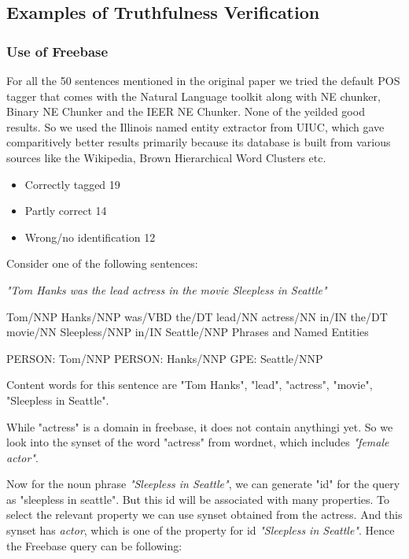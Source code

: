 \documentclass[11pt]{article}
\begin{document}
\subsection{Examples of Truthfulness Verification}

\subsubsection{Use of Freebase}

For all the 50 sentences mentioned in the original paper we tried the default POS tagger that comes with the Natural Language toolkit along with NE chunker, Binary NE Chunker and the IEER NE Chunker. None of the yeilded good results. So we used the Illinois named entity extractor from UIUC, which gave comparitively better results primarily because its database is built from various sources like the Wikipedia, Brown Hierarchical Word Clusters etc. 

\begin{itemize}
\item Correctly tagged 19
\item Partly correct 14	
\item Wrong/no identification 12
\end{itemize}



Consider one of the following sentences:

\emph{"Tom Hanks was the lead actress in the movie Sleepless in Seattle"}

Tom/NNP Hanks/NNP was/VBD the/DT lead/NN actress/NN in/IN the/DT movie/NN Sleepless/NNP in/IN Seattle/NNP
Phrases and Named Entities

PERSON:
    Tom/NNP
PERSON:
    Hanks/NNP
GPE:
    Seattle/NNP

Content words for this sentence are "Tom Hanks", "lead", "actress", "movie", "Sleepless in Seattle". 

While "actress" is a domain in freebase, it does not contain anythingi yet. So we look into the synset of the word "actress" from wordnet, which includes \emph{"female actor"}.

Now for the noun phrase \emph{"Sleepless in Seattle"}, we can generate "id" for the query as "sleepless in seattle". But this id will be associated with many properties. To select the relevant property we can use synset obtained from the actress. And this synset has {\em actor}, which is one of the property for id {\em "Sleepless in Seattle"}. Hence the Freebase query can be following:
\end{document}

